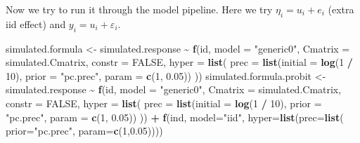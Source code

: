 \documentclass[
]{article}
\newenvironment{Shaded}{\begin{snugshade}}{\end{snugshade}}
\newcommand{\AttributeTok}[1]{\textcolor[rgb]{0.13,0.29,0.53}{#1}}
\newcommand{\ConstantTok}[1]{\textcolor[rgb]{0.56,0.35,0.01}{#1}}
\newcommand{\DecValTok}[1]{\textcolor[rgb]{0.00,0.00,0.81}{#1}}
\newcommand{\FloatTok}[1]{\textcolor[rgb]{0.00,0.00,0.81}{#1}}
\newcommand{\FunctionTok}[1]{\textcolor[rgb]{0.13,0.29,0.53}{\textbf{#1}}}
\newcommand{\NormalTok}[1]{#1}
\newcommand{\OtherTok}[1]{\textcolor[rgb]{0.56,0.35,0.01}{#1}}
\newcommand{\SpecialCharTok}[1]{\textcolor[rgb]{0.81,0.36,0.00}{\textbf{#1}}}
\newcommand{\StringTok}[1]{\textcolor[rgb]{0.31,0.60,0.02}{#1}}
\begin{document}
Now we try to run it through the model pipeline. Here we try
\(\eta_i = u_i + e_i\) (extra iid effect) and
\(y_i = u_i+\varepsilon_i\).

\begin{Shaded}
\begin{Highlighting}[]
\NormalTok{simulated.formula }\OtherTok{\textless{}{-}}\NormalTok{ simulated.response }\SpecialCharTok{\textasciitilde{}}  \FunctionTok{f}\NormalTok{(id,}
  \AttributeTok{model =} \StringTok{"generic0"}\NormalTok{,}
  \AttributeTok{Cmatrix =}\NormalTok{ simulated.Cmatrix,}
  \AttributeTok{constr =} \ConstantTok{FALSE}\NormalTok{,}
  \AttributeTok{hyper =} \FunctionTok{list}\NormalTok{(}
    \AttributeTok{prec =} \FunctionTok{list}\NormalTok{(}\AttributeTok{initial =} \FunctionTok{log}\NormalTok{(}\DecValTok{1} \SpecialCharTok{/} \DecValTok{10}\NormalTok{), }\AttributeTok{prior =} \StringTok{"pc.prec"}\NormalTok{,}
                \AttributeTok{param =} \FunctionTok{c}\NormalTok{(}\DecValTok{1}\NormalTok{, }\FloatTok{0.05}\NormalTok{))}
\NormalTok{  ))}
\NormalTok{simulated.formula.probit }\OtherTok{\textless{}{-}}\NormalTok{ simulated.response }\SpecialCharTok{\textasciitilde{}}  \FunctionTok{f}\NormalTok{(id,}
  \AttributeTok{model =} \StringTok{"generic0"}\NormalTok{,}
  \AttributeTok{Cmatrix =}\NormalTok{ simulated.Cmatrix,}
  \AttributeTok{constr =} \ConstantTok{FALSE}\NormalTok{,}
  \AttributeTok{hyper =} \FunctionTok{list}\NormalTok{(}
    \AttributeTok{prec =} \FunctionTok{list}\NormalTok{(}\AttributeTok{initial =} \FunctionTok{log}\NormalTok{(}\DecValTok{1} \SpecialCharTok{/} \DecValTok{10}\NormalTok{), }\AttributeTok{prior =} \StringTok{"pc.prec"}\NormalTok{,}
                \AttributeTok{param =} \FunctionTok{c}\NormalTok{(}\DecValTok{1}\NormalTok{, }\FloatTok{0.05}\NormalTok{))}
\NormalTok{  )) }\SpecialCharTok{+} \FunctionTok{f}\NormalTok{(ind, }\AttributeTok{model=}\StringTok{"iid"}\NormalTok{, }\AttributeTok{hyper=}\FunctionTok{list}\NormalTok{(}\AttributeTok{prec=}\FunctionTok{list}\NormalTok{(}
    \AttributeTok{prior=}\StringTok{"pc.prec"}\NormalTok{, }\AttributeTok{param=}\FunctionTok{c}\NormalTok{(}\DecValTok{1}\NormalTok{,}\FloatTok{0.05}\NormalTok{))))}


\end{Highlighting}
\end{Shaded}
\end{document}
